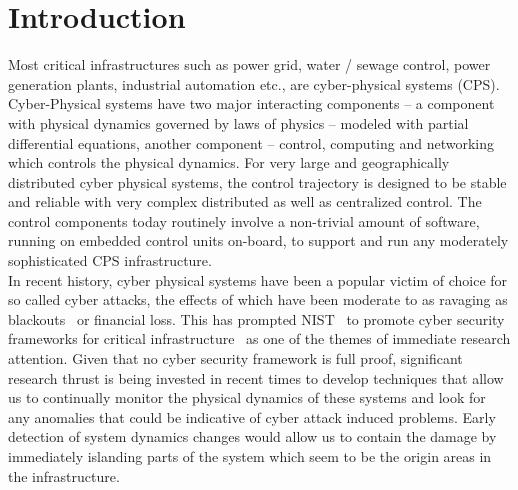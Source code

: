\section{Introduction} \label{sec:intro}
\noindent
Most critical infrastructures such as power grid, water / sewage control, power generation plants, industrial automation etc., are cyber-physical systems (CPS). Cyber-Physical systems have two major interacting components -- a component with physical dynamics governed by laws of physics -- modeled with partial differential equations, another component -- control, computing and networking which controls the physical dynamics. For very large and geographically distributed cyber physical systems, the control trajectory is designed to be stable and reliable with very complex distributed as well as centralized control. The control components today 
routinely involve a non-trivial amount of software, running on embedded control units on-board, to support and run any moderately sophisticated CPS infrastructure. \\

\noindent
In recent history, cyber physical systems have been a popular victim of choice for so called cyber attacks, the effects of which have been moderate to as ravaging as blackouts~\cite{blackout} or financial loss. This has prompted 
NIST~\cite{nist} to promote cyber security frameworks for critical infrastructure~\cite{cs-Framewrok} as 
one of the themes of immediate research attention. Given that no cyber security framework is full proof, significant research thrust is being invested in recent times to develop techniques that allow us to continually monitor the physical dynamics of these systems and look for any anomalies that could be indicative of cyber attack induced problems. Early detection of system dynamics changes would allow us to contain the damage by immediately islanding parts of the system which seem to be the origin areas in the infrastructure. \\

